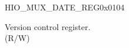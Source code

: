 \begin{register}{H}{IO\_MUX\_DATE\_REG}{0x0104}\label{regdesc:IOMUXDATEREG}
%
%
\regnewline%
\begin{regdesc}\begin{reglist}
\label{fielddesc:IOMUXDATE}\item [IO\_MUX\_DATE] Version control register. \\
(R/W)
\end{reglist}\end{regdesc}
\end{register}


